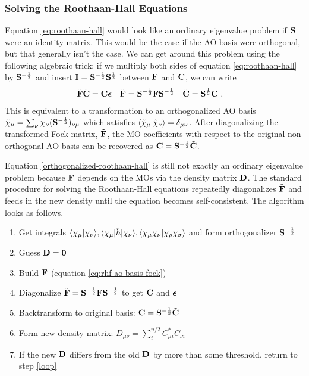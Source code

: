 \documentclass[11pt]{article}
\numberwithin{equation}{section}
\begin{document}
\subsubsection{Solving the Roothaan-Hall Equations}

Equation \ref{eq:roothaan-hall} would look like an ordinary eigenvalue problem if $\mathbf{S}$ were an identity matrix.
This would be the case if the AO basis were orthogonal, but that generally isn't the case.
We can get around this problem using the following algebraic trick:
if we multiply both sides of equation \ref{eq:roothaan-hall} by $\mathbf{S}^{-\frac{1}{2}}$ and insert $\mathbf{I}=\mathbf{S}^{-\frac{1}{2}}\mathbf{S}^{\frac{1}{2}}$ between $\mathbf{F}$ and $\mathbf{C}$, we can write
\begin{align}
\label{orthogonalized-roothaan-hall}
&
  \tl{\bo{F}}
  \tl{\bo{C}}
=
  \tl{\bo{C}}\bm\ev
&&
  \tl{\bo{F}}
=
  \bo{S}^{-\frac{1}{2}}\bo{F}\bo{S}^{-\frac{1}{2}}
&&
  \tl{\bo{C}}
=
  \bo{S}^{\frac{1}{2}}\bo{C}\ .
\end{align}
This is equivalent to a transformation to an orthogonalized AO basis $\tl\x_\mu=\sum_\nu\x_\nu (\bo{S}^{-\frac{1}{2}})_{\nu\mu}$ which satisfies $\ip{\tl\x_\mu|\tl\x_\nu}=\d_{\mu\nu}$.
After diagonalizing the transformed Fock matrix, $\tilde{\mathbf{F}}$, the MO coefficients with respect to the original non-orthogonal AO basis can be recovered as $\mathbf{C}=\mathbf{S}^{-\frac{1}{2}}\tilde{\mathbf{C}}$.

\begin{samepage}
Equation \ref{orthogonalized-roothaan-hall} is still not exactly an ordinary eigenvalue problem because $\mathbf{F}$ depends on the MOs via the density matrix $\mathbf{D}$.
The standard procedure for solving the Roothaan-Hall equations repeatedly diagonalizes $\tilde{\mathbf{F}}$ and feeds in the new density until the equation becomes self-consistent.
The algorithm looks as follows.
\begin{enumerate}
  \item Get integrals $\ip{\x_\mu|\x_\nu}, \ip{\x_\mu|\op{h}|\x_\nu}, \ip{\x_\mu\x_\nu|\x_\rho\x_\si}$ and form orthogonalizer $\mathbf{S}^{-\frac{1}{2}}$
  \item Guess $\mathbf{D}=\mathbf{0}$
  \item\label{loop} Build $\mathbf{F}$ (equation \ref{eq:rhf-ao-basis-fock})
  \item Diagonalize $\tilde{\mathbf{F}}=\mathbf{S}^{-\frac{1}{2}}\mathbf{F}\mathbf{S}^{-\frac{1}{2}}$ to get $\tilde{\mathbf{C}}$ and $\bm\ev$
  \item Backtransform to original basis: $\mathbf{C}=\mathbf{S}^{-\frac{1}{2}}\tilde{\mathbf{C}}$
  \item Form new density matrix: $D_{\mu\nu}=\sum_i^{n/2} C_{\mu i}^*C_{\nu i}$
  \item If the new $\mathbf{D}$ differs from the old $\mathbf{D}$ by more than some threshold, return to step \ref{loop}
\end{enumerate}
\end{samepage}
\end{document}
